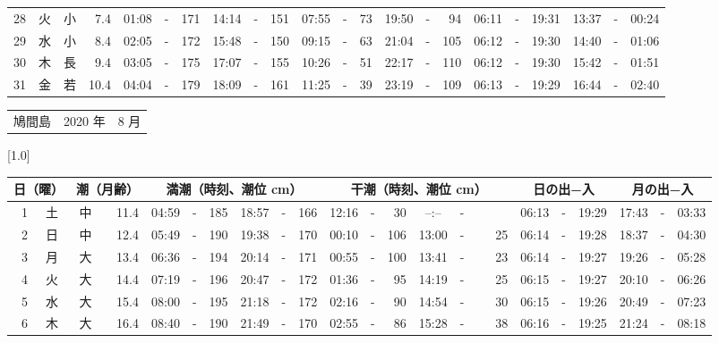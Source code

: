 \documentclass[12pt,a4j]{jsarticle}
\begin{document}
\begin{table}[htbp]
\begin{center}
{\begin{tabular}{|rc|cr|ccrccr|ccrccr|ccc|ccc|}
28 & 火 & 小 &  7.4 &  01:08 &-& 171 &  14:14 &-& 151 &  07:55 &-&  73 &  19:50 &-&  94 & 06:11 & -& 19:31 & 13:37 & -& 00:24 \\
29 & 水 & 小 &  8.4 &  02:05 &-& 172 &  15:48 &-& 150 &  09:15 &-&  63 &  21:04 &-& 105 & 06:12 & -& 19:30 & 14:40 & -& 01:06 \\
30 & 木 & 長 &  9.4 &  03:05 &-& 175 &  17:07 &-& 155 &  10:26 &-&  51 &  22:17 &-& 110 & 06:12 & -& 19:30 & 15:42 & -& 01:51 \\
31 & 金 & 若 & 10.4 &  04:04 &-& 179 &  18:09 &-& 161 &  11:25 &-&  39 &  23:19 &-& 109 & 06:13 & -& 19:29 & 16:44 & -& 02:40 \\
   \hline
   \end{tabular}}
   \end{center}
\end{table}
\newpage
 \begin{table}[htbp]
 \begin{center}
 \begin{tabular}{lcc}
 \LARGE{鳩間島}  & \large{2020 年} & \large{ 8 月} \\
 \end{tabular}
 \end{center}
 \begin{center}
    \scalebox{0.7}[1.0]{
    \begin{tabular}{|rc|cr|ccrccr|ccrccr|ccc|ccc|}
    \hline
    \multicolumn{2}{|c|}{日（曜）} & \multicolumn{2}{c|}{潮（月齢）} & \multicolumn{6}{c|}{満潮（時刻、潮位 cm）} & \multicolumn{6}{c|}{干潮（時刻、潮位 cm）} & \multicolumn{3}{c|}{日の出−入} &  \multicolumn{3}{c|}{月の出−入}\\
 \hline
 1 & 土 & 中 & 11.4 &  04:59 &-& 185 &  18:57 &-& 166 &  12:16 &-&  30 &  --:-- &-&~~~~~ & 06:13 & -& 19:29 & 17:43 & -& 03:33 \\
 2 & 日 & 中 & 12.4 &  05:49 &-& 190 &  19:38 &-& 170 &  00:10 &-& 106 &  13:00 &-&  25 & 06:14 & -& 19:28 & 18:37 & -& 04:30 \\
 3 & 月 & 大 & 13.4 &  06:36 &-& 194 &  20:14 &-& 171 &  00:55 &-& 100 &  13:41 &-&  23 & 06:14 & -& 19:27 & 19:26 & -& 05:28 \\
 4 & 火 & 大 & 14.4 &  07:19 &-& 196 &  20:47 &-& 172 &  01:36 &-&  95 &  14:19 &-&  25 & 06:15 & -& 19:27 & 20:10 & -& 06:26 \\
 5 & 水 & 大 & 15.4 &  08:00 &-& 195 &  21:18 &-& 172 &  02:16 &-&  90 &  14:54 &-&  30 & 06:15 & -& 19:26 & 20:49 & -& 07:23 \\
 6 & 木 & 大 & 16.4 &  08:40 &-& 190 &  21:49 &-& 170 &  02:55 &-&  86 &  15:28 &-&  38 & 06:16 & -& 19:25 & 21:24 & -& 08:18 \\

\end{tabular}}
\end{center}
\end{table}
\end{document}

